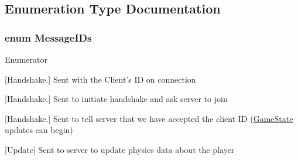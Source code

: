 \subsection{Enumeration Type Documentation}
\hypertarget{group__server_ga4301bf0fa2a92b524daa9d4d1f9aa9e3}{
\subsubsection[{Message\-I\-Ds}]{\setlength{\rightskip}{0pt plus 5cm}enum {\bf Message\-I\-Ds}}}\label{group__server_ga4301bf0fa2a92b524daa9d4d1f9aa9e3}
\begin{Desc}
\item[Enumerator]\par
\begin{description}
\item[{\em 
\hypertarget{group__server_gga4301bf0fa2a92b524daa9d4d1f9aa9e3a59f5ae9c1d42ffd00714368264eab9b9}{Handshake\-Client\-I\-D}\label{group__server_gga4301bf0fa2a92b524daa9d4d1f9aa9e3a59f5ae9c1d42ffd00714368264eab9b9}
}]\mbox{[}Handshake.\mbox{]} Sent with the Client's I\-D on connection \item[{\em 
\hypertarget{group__server_gga4301bf0fa2a92b524daa9d4d1f9aa9e3ab1eef7245d0a1b3e7cd8ed83fe0a3f8b}{Handshake\-Join}\label{group__server_gga4301bf0fa2a92b524daa9d4d1f9aa9e3ab1eef7245d0a1b3e7cd8ed83fe0a3f8b}
}]\mbox{[}Handshake.\mbox{]} Sent to initiate handshake and ask server to join \item[{\em 
\hypertarget{group__server_gga4301bf0fa2a92b524daa9d4d1f9aa9e3a4e3ac0d64fe8a89bf1ce5dd7b99a3c27}{Handshake\-Accept}\label{group__server_gga4301bf0fa2a92b524daa9d4d1f9aa9e3a4e3ac0d64fe8a89bf1ce5dd7b99a3c27}
}]\mbox{[}Handshake.\mbox{]} Sent to tell server that we have accepted the client I\-D (\hyperlink{class_game_state}{Game\-State} updates can begin) \item[{\em 
\hypertarget{group__server_gga4301bf0fa2a92b524daa9d4d1f9aa9e3a83a27501d9ed8bebed49bcd5bb152f9e}{Update\-Player\-Physics}\label{group__server_gga4301bf0fa2a92b524daa9d4d1f9aa9e3a83a27501d9ed8bebed49bcd5bb152f9e}
}]\mbox{[}Update\mbox{]} Sent to server to update physics data about the player \end{description}
\end{Desc}

